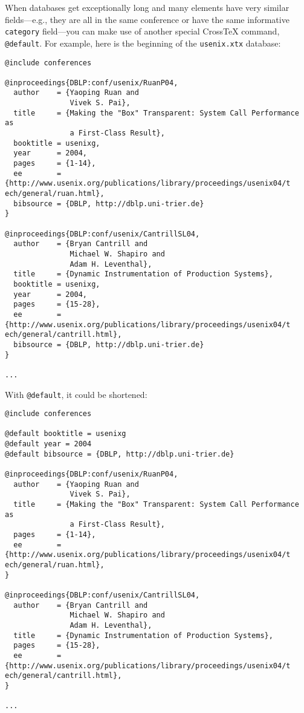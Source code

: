\documentclass{article}
\newcommand{\XTeX}{Cross\TeX}
\begin{document}
When databases get exceptionally long and many elements have very similar fields---e.g., they are all in the same conference or have the same informative \texttt{category} field---you can make use of another special \XTeX{} command, \texttt{@default}. For example, here is the beginning of the \texttt{usenix.xtx} database:

\begin{small}\begin{verbatim}
@include conferences

@inproceedings{DBLP:conf/usenix/RuanP04,
  author    = {Yaoping Ruan and
               Vivek S. Pai},
  title     = {Making the "Box" Transparent: System Call Performance as
               a First-Class Result},
  booktitle = usenixg,
  year      = 2004,
  pages     = {1-14},
  ee        = {http://www.usenix.org/publications/library/proceedings/usenix04/t
ech/general/ruan.html},
  bibsource = {DBLP, http://dblp.uni-trier.de}
}

@inproceedings{DBLP:conf/usenix/CantrillSL04,
  author    = {Bryan Cantrill and
               Michael W. Shapiro and
               Adam H. Leventhal},
  title     = {Dynamic Instrumentation of Production Systems},
  booktitle = usenixg,
  year      = 2004,
  pages     = {15-28},
  ee        = {http://www.usenix.org/publications/library/proceedings/usenix04/t
ech/general/cantrill.html},
  bibsource = {DBLP, http://dblp.uni-trier.de}
}

...
\end{verbatim}\end{small}

With \texttt{@default}, it could be shortened:

\begin{small}\begin{verbatim}
@include conferences

@default booktitle = usenixg
@default year = 2004
@default bibsource = {DBLP, http://dblp.uni-trier.de}

@inproceedings{DBLP:conf/usenix/RuanP04,
  author    = {Yaoping Ruan and
               Vivek S. Pai},
  title     = {Making the "Box" Transparent: System Call Performance as
               a First-Class Result},
  pages     = {1-14},
  ee        = {http://www.usenix.org/publications/library/proceedings/usenix04/t
ech/general/ruan.html},
}

@inproceedings{DBLP:conf/usenix/CantrillSL04,
  author    = {Bryan Cantrill and
               Michael W. Shapiro and
               Adam H. Leventhal},
  title     = {Dynamic Instrumentation of Production Systems},
  pages     = {15-28},
  ee        = {http://www.usenix.org/publications/library/proceedings/usenix04/t
ech/general/cantrill.html},
}

...
\end{verbatim}\end{small}
\end{document}
